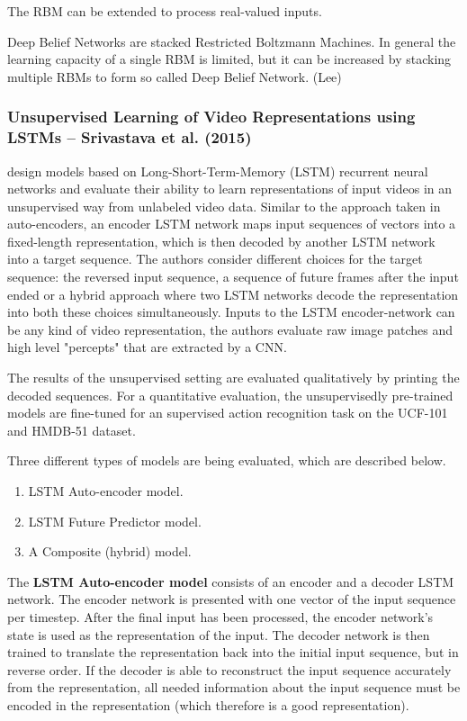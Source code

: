 The RBM can be extended to process real-valued inputs.

Deep Belief Networks are stacked Restricted Boltzmann Machines.
In general the learning capacity of a single RBM is limited, but it can be increased by stacking multiple RBMs to form so called Deep Belief Network. (Lee)

\subsubsection{Unsupervised Learning of Video Representations using LSTMs -- Srivastava et al. (2015)}
\cite{srivastava_unsupervised_2015}

\textcite{srivastava_unsupervised_2015} design models based on Long-Short-Term-Memory (LSTM) recurrent neural networks and evaluate their ability to learn representations of input videos in an unsupervised way from unlabeled video data.
Similar to the approach taken in auto-encoders, an encoder LSTM network maps input sequences of vectors into a fixed-length representation, which is then decoded by another LSTM network into a target sequence.
The authors consider different choices for the target sequence: the reversed input sequence, a sequence of future frames after the input ended or a hybrid approach where two LSTM networks decode the representation into both these choices simultaneously.
Inputs to the LSTM encoder-network can be any kind of video representation, the authors evaluate raw image patches and high level "percepts" that are extracted by a CNN.

The results of the unsupervised setting are evaluated qualitatively by printing the decoded sequences. For a quantitative evaluation, the unsupervisedly pre-trained models are fine-tuned for an supervised action recognition task on the UCF-101 and HMDB-51 dataset.

Three different types of models are being evaluated, which are described below.
\begin{enumerate}
    \item LSTM Auto-encoder model.
    \item LSTM Future Predictor model.
    \item A Composite (hybrid) model.
\end{enumerate}

The \textbf{LSTM Auto-encoder model} consists of an encoder and a decoder LSTM network.
The encoder network is presented with one vector of the input sequence per timestep.
After the final input has been processed, the encoder network's state is used as the representation of the input.
The decoder network is then trained to translate the representation back into the initial input sequence, but in reverse order.
If the decoder is able to reconstruct the input sequence accurately from the representation, all needed information about the input sequence must be encoded in the representation (which therefore is a good representation).

